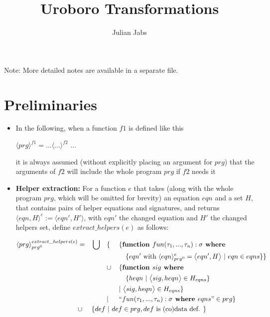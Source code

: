 \documentclass[11pt]{article} %
\title{Uroboro Transformations}
\author{Julian Jabs}
\begin{document}
\maketitle

Note: More detailed notes are available in a separate file.


\section{Preliminaries}

\begin{itemize}

\item In the following, when a function $f1$ is defined like this

$\langle prg \rangle^{f1} = ... \langle ... \rangle^{f2}$ ...

it is always assumed (without explicitly placing an argument for $prg$) that the arguments of $f2$ will include the whole program $prg$ if $f2$ needs it

\item \textbf{Helper extraction:} For a function $e$ that takes (along with the whole program $prg$, which will be omitted for brevity) an equation $eqn$ and a set $H$, that contains pairs of helper equations and signatures, and returns $\langle eqn, H \rangle^e := \big\langle eqn', H' \big\rangle$, with $eqn'$ the changed equation and $H'$ the changed helpers set, define $extract\_helpers(e)$ as follows:

\begin{alignat*}{4}
\langle prg \rangle^{extract\_helpers(e)}_{prg^0} & = &&\bigcup &&\{ ~&&\{ \textrm{\textbf{function }} fun(\tau_1, ..., \tau_n): \sigma \textrm{\textbf{ where }} \\
& && && &&\quad \{ eqn' \textrm{ with } \langle eqn \rangle^{e}_{prg^0} = \big\langle eqn', H \big\rangle ~ | ~ eqn \in eqns \} \} \\
& && && \cup && \{ \textrm{\textbf{function }} sig \textrm{\textbf{ where }} \\
& && && &&\quad \{ heqn ~ | ~ \big\langle sig, heqn \big\rangle \in H_{eqns} \} \\
& && && && | ~  \big\langle sig, heqn \big\rangle \in H_{eqns} \} \\
& && && | && `` fun (\tau_1, ..., \tau_n): \sigma \textrm{\textbf{ where }} eqns " \in prg \} \\
& \cup && \{ def ~ | ~ def \in prg, def \textrm{ is (co)data def. } \} \span\span\span\span
\end{alignat*}


\end{itemize}
\end{document}

